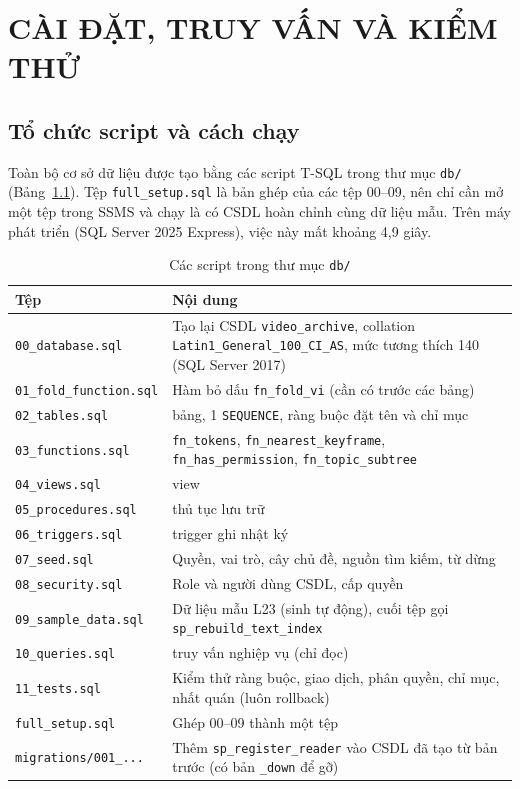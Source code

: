 \chapter{CÀI ĐẶT, TRUY VẤN VÀ KIỂM THỬ}

\section{Tổ chức script và cách chạy}

Toàn bộ cơ sở dữ liệu được tạo bằng các script T-SQL trong thư mục \texttt{db/}
(Bảng~\ref{tab:scripts}). Tệp \texttt{full\_setup.sql} là bản ghép của các tệp 00--09, nên
chỉ cần mở một tệp trong SSMS và chạy là có CSDL hoàn chỉnh cùng dữ liệu mẫu. Trên máy phát
triển (SQL Server 2025 Express), việc này mất khoảng 4,9 giây.

\begin{table}[H]
\centering
\caption{Các script trong thư mục \texttt{db/}}
\label{tab:scripts}
\renewcommand{\arraystretch}{1.15}
\begin{tabularx}{\textwidth}{>{\raggedright\arraybackslash}p{5.0cm} >{\raggedright\arraybackslash}X}
\toprule
\textbf{Tệp} & \textbf{Nội dung} \\
\midrule
\texttt{00\_database.sql} & Tạo lại CSDL \texttt{video\_archive}, collation \texttt{Latin1\_General\_100\_CI\_AS}, mức tương thích 140 (SQL Server 2017) \\
\texttt{01\_fold\_function.sql} & Hàm bỏ dấu \texttt{fn\_fold\_vi} (cần có trước các bảng) \\
\texttt{02\_tables.sql} & 30 bảng, 1 \texttt{SEQUENCE}, ràng buộc đặt tên và chỉ mục \\
\texttt{03\_functions.sql} & \texttt{fn\_tokens}, \texttt{fn\_nearest\_keyframe}, \texttt{fn\_has\_permission}, \texttt{fn\_topic\_subtree} \\
\texttt{04\_views.sql} & 11 view \\
\texttt{05\_procedures.sql} & 10 thủ tục lưu trữ \\
\texttt{06\_triggers.sql} & 6 trigger ghi nhật ký \\
\texttt{07\_seed.sql} & Quyền, vai trò, cây chủ đề, nguồn tìm kiếm, từ dừng \\
\texttt{08\_security.sql} & Role và người dùng CSDL, cấp quyền \\
\texttt{09\_sample\_data.sql} & Dữ liệu mẫu L23 (sinh tự động), cuối tệp gọi \texttt{sp\_rebuild\_text\_index} \\
\texttt{10\_queries.sql} & 25 truy vấn nghiệp vụ (chỉ đọc) \\
\texttt{11\_tests.sql} & Kiểm thử ràng buộc, giao dịch, phân quyền, chỉ mục, nhất quán (luôn rollback) \\
\texttt{full\_setup.sql} & Ghép 00--09 thành một tệp \\
\texttt{migrations/001\_...} & Thêm \texttt{sp\_register\_reader} vào CSDL đã tạo từ bản trước (có bản \texttt{\_down} để gỡ) \\
\bottomrule
\end{tabularx}
\end{table}


